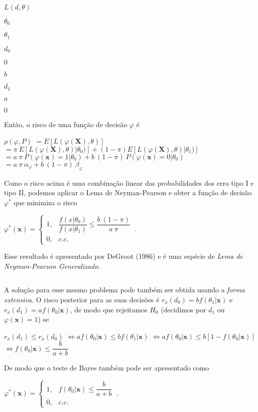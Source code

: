 \documentclass[
]{book}
\begin{document}
\(L(d,\theta)\)

\(\theta_0\)

\(\theta_1\)

\(d_0\)

\(0\)

\(b\)

\(d_1\)

\(a\)

\(0\)

Então, o risco de uma função de decisão \(\varphi\) é

\(\rho(\varphi,P)\) \(=E\left[L(\varphi(\boldsymbol X),\theta)\right]\)
\(= \pi~E\left[L(\varphi(\boldsymbol X),\theta)\big|\theta_0)\right] + (1-\pi)E\left[L(\varphi(\boldsymbol X),\theta)\big|\theta_1)\right]\)
\(= a~\pi~P\left(\varphi(\boldsymbol x)=1\big|\theta_0\right) + b~(1-\pi)~P\left(\varphi(\boldsymbol x)=0\big|\theta_0\right)\)
\(= a~\pi~\alpha_\varphi + b~(1-\pi)~\beta_\varphi\)

Como o risco acima é uma combinação linear das probabilidades dos erro tipo I e tipo II, podemos aplicar o Lema de Neyman-Pearson e obter a função de decisão \(\varphi^*\) que minimiza o risco

\({\varphi}^*(\boldsymbol x)=\left\{\begin{array}{rl} 1,& \dfrac{f(x|\theta_0)}{f(x|\theta_1)}\leq \dfrac{b~(1-\pi)}{a~\pi}\\ 0,& c.c.\end{array}\right.~.\)

Esse resultado é apresentado por DeGroot (1986) e é uma espécie de \emph{Lema de Neyman-Pearson Generalizado}.

\(~\)

A solução para esse mesmo problema pode também ser obtida usando a \emph{forma extensiva}. O risco posterior para as suas decisões é \(r_x(d_0) = b f(\theta_1|\boldsymbol x)\) e \(r_x(d_1) = a f(\theta_0|\boldsymbol x)\), de modo que rejeitamos \(H_0\) (decidimos por \(d_1\) ou \(\varphi(\boldsymbol x)=1\)) se

\(r_x(d_1) \leq r_x(d_0)\)
\(\Longleftrightarrow a f(\theta_0|\boldsymbol x) \leq b f(\theta_1|\boldsymbol x)\)
\(\Longleftrightarrow a f(\theta_0|\boldsymbol x) \leq b \left[1-f(\theta_0|\boldsymbol x)\right]\)
\(\Longleftrightarrow f(\theta_0|\boldsymbol x) \leq \dfrac{b}{a+b}\)

De modo que o teste de Bayes também pode ser apresentado como

\({\varphi}^*(\boldsymbol x)=\left\{\begin{array}{rl} 1,& f(\theta_0|\boldsymbol x) \leq \dfrac{b}{a+b} \\ 0,& c.c.\end{array}\right.~.\)
\end{document}
